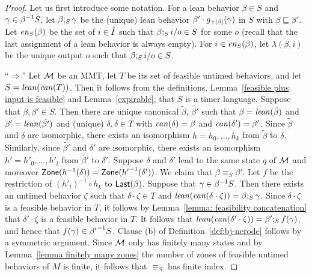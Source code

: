 \newcommand{\tildebeta}{\tilde{\beta}}
\newcommand{\tildebetap}{\tilde{\beta'}}
\begin{proof} 

  Let us first introduce some notation.
  For a lean behavior $\beta\in S$ and $\gamma \in \suffixbehs{S}{\beta}$, let
$\beta\compose{S}\gamma$ be the (unique) lean behavior $\beta'\cdot\suffmap{|\beta|}(\gamma)$ in $S$ with $\beta \sqsubseteq \beta'$.
Let $\feasibleinputs{\beta}{S}$ be the set of $i \in \extinputs$ such that
$\beta \compose{S} \simpleutlabel{i}{o} \in S$ for some $o$ (recall that the
last assignment of a lean behavior is always empty).
For $i \in \feasibleinputs{\beta}{S}$, let $\lambda(\beta,i)$ be the unique
output $o$ such that $\beta \compose{S} \simpleutlabel{i}{o} \in S$.

``$\Rightarrow$'' Let $\M$ be an MMT, let $T$ be its set of feasible untimed behaviors, and let $S = \lean{\can{T}}$.
Then it follows from the definitions, Lemma~\ref{feasible plus input is feasible} and Lemma~\ref{expirable}, that $S$ is a timer language.
Suppose that $\beta, \beta' \in S$.
Then there are unique canonical $\tildebeta$, $\tildebetap$ such that
$\beta = \lean{\tildebeta}$ and $\beta' = \lean{\tildebetap}$ and
(unique) $\delta, \delta \in T$ with
$\can{\delta}=\beta$ and $\can{\delta'}=\beta'$.
Since $\tildebeta$ and $\delta$ are isomorphic, there exists an isomorphism
$h = h_0 ,\ldots, h_k$ from $\tildebeta$ to $\delta$.
Similarly, since $\tildebetap$ and $\delta'$ are isomorphic, there exists an isomorphism $h' = h'_0 ,\ldots, h'_l$ from $\tildebetap$ to $\delta'$.
Suppose $\delta$ and $\delta'$ lead to the same state $q$ of $\M$ and moreover $\Zone{h^{-1}(\delta)} = \Zone{{h'}^{-1}(\delta')}$.
We claim that $\beta \equiv_S \beta'$.
Let $f$ be the restriction of $(h'_l)^{-1} \circ h_k$ to $\Last{\beta}$.
Suppose that $\gamma \in \suffixbehs{S}{\beta}$.
Then there exists an untimed behavior $\zeta$ such that $\delta \cdot \zeta \in T$ and $\lean{\can{\delta \cdot \zeta}} = \beta \compose{S} \gamma$.
Since $\delta \cdot \zeta$ is a feasible behavior in $T$, it follows by Lemma~\ref{lemma: feasibility concatenation} that
$\delta' \cdot \zeta$ is a feasible behavior in $T$.
It follows that 
$\lean{\can{\delta' \cdot \zeta}} = \beta' \compose{S} f(\gamma)$, and hence
that $f(\gamma) \in \suffixbehs{S}{\beta'}$.
Clause (b) of Definition~\ref{def:bj-nerode} follows by a symmetric argument.
Since $\M$ only has finitely many states and by Lemma~\ref{lemma finitely many zones} the number of zones of feasible
untimed behaviors of $M$ is finite, it follows that $\equiv_S$ has finite index.


\end{proof}
